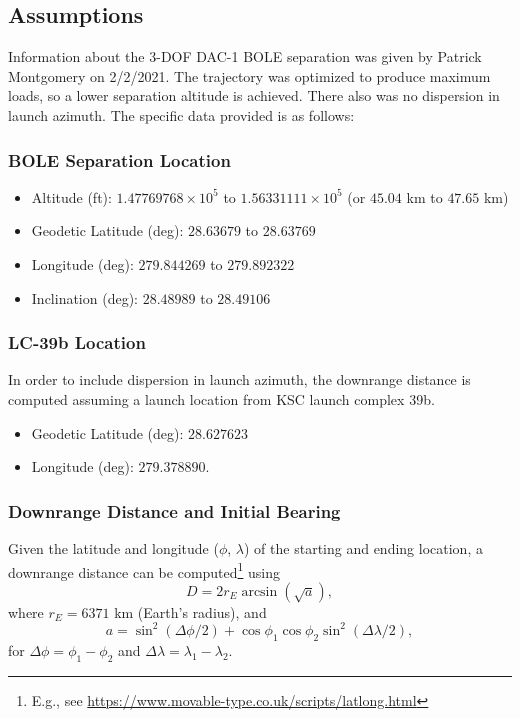 \documentclass{hitec}
\begin{document}
\subsection{Assumptions}\label{ssec:Assumptions}

Information about the 3-DOF DAC-1 BOLE separation was given by Patrick Montgomery on 2/2/2021. The trajectory was optimized to produce maximum loads, so a lower separation altitude is achieved. There also was no dispersion in launch azimuth. The specific data provided is as follows:
\subsubsection{BOLE Separation Location}
\begin{itemize}
	\item Altitude (ft): $1.47769768\times 10^5$ to $1.56331111\times 10^5$ (or $45.04$ km to $47.65$ km)
	\item Geodetic Latitude (deg): $28.63679$ to $28.63769$
	\item Longitude (deg): $279.844269$ to $279.892322$
	\item Inclination (deg): $28.48989$ to $28.49106$
\end{itemize}


\subsubsection{LC-39b Location}
In order to include dispersion in launch azimuth, the downrange distance is computed assuming a launch location from KSC launch complex 39b.
\begin{itemize}
	\item Geodetic Latitude (deg): $28.627623$
	\item Longitude (deg): $279.378890$.
\end{itemize}

\subsubsection{Downrange Distance and Initial Bearing}
Given the latitude and longitude ($\phi$, $\lambda$) of the starting and ending location, a downrange distance can be computed\footnote{E.g., see \url{https://www.movable-type.co.uk/scripts/latlong.html}} using
\begin{equation}
	D = 2r_E\arcsin(\sqrt{a}),
\end{equation}
where $r_E = 6371$ km (Earth's radius), and
\begin{equation}
	a = \sin^2(\Delta\phi/2) + \cos\phi_1\cos\phi_2\sin^2(\Delta\lambda/2),
\end{equation}
for $\Delta\phi = \phi_1-\phi_2$ and $\Delta\lambda = \lambda_1-\lambda_2$.
\end{document}
